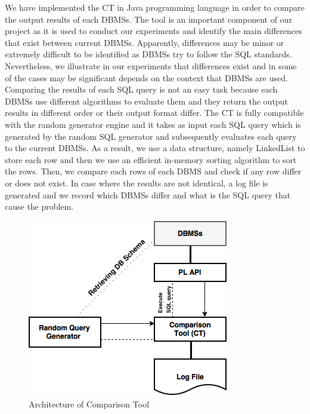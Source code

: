 We have implemented the CT in Java programming language in order to compare the output results of each DBMSs. The tool is an important component of our project as it is used to conduct our experiments and identify the main differences that exist between current DBMSs. Apparently, differences may be minor or extremely difficult to be identified as DBMSs try to follow the SQL standards. Nevertheless, we illustrate in our experiments that differences exist and in some of the cases may be significant depends on the context that DBMSs are used. Comparing the results of each SQL query is not an easy task because each DBMSs use different algorithms to evaluate them and they return the output results in different order or their output format differ. The CT is fully compatible with the random generator engine and it takes as input each SQL query which is generated by the random SQL generator and subsequently evaluates each query to the current DBMSs. As a result, we use a data structure, namely LinkedList to store each row and then we use an efficient in-memory sorting algorithm to sort the rows. Then, we compare each rows of each DBMS and check if any row differ or does not exist. In case where the results are not identical, a log file is generated and we record which DBMSs differ and what is the SQL query that cause the problem.

 \begin{figure} 
      \centering
      \includegraphics[width=\textwidth]{Images/Chapter4/3-ComparisonTool}
      \caption{Architecture of Comparison Tool}
      \label{fig:counting-methods}
  \end{figure}


